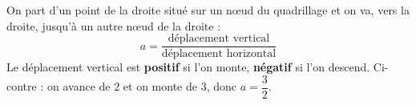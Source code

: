 \documentclass[11pt,a4paper]{article}
\newcommand{\quadrillage}[4]{\draw[grille,step=1] (#1,#2) grid (#3,#4);}
\begin{document}
\begin{remarquebox}
\begin{minipage}[c]{0.6\linewidth}\raggedright
On part d'un point de la droite situé sur un nœud du quadrillage et on va, vers la
droite, jusqu'à un autre nœud de la droite :
\[
  a=\frac{\text{déplacement vertical}}{\text{déplacement horizontal}}
\]
Le déplacement vertical est \textbf{positif} si l'on monte, \textbf{négatif} si l'on
descend. Ci-contre : on avance de $2$ et on monte de $3$, donc $a=\dfrac{3}{2}$.
\end{minipage}\hfill
\begin{minipage}[c]{0.36\linewidth}\centering
{}
\end{minipage}
\end{remarquebox}
\end{document}
